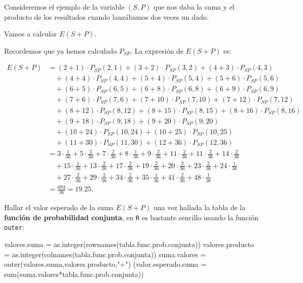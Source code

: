 \documentclass[
  letterpaper,
  DIV=11,
  numbers=noendperiod]{scrreprt}
\newenvironment{Shaded}{\begin{snugshade}}{\end{snugshade}}
\newcommand{\AttributeTok}[1]{\textcolor[rgb]{0.40,0.45,0.13}{#1}}
\newcommand{\FunctionTok}[1]{\textcolor[rgb]{0.28,0.35,0.67}{#1}}
\newcommand{\NormalTok}[1]{\textcolor[rgb]{0.00,0.23,0.31}{#1}}
\newcommand{\OtherTok}[1]{\textcolor[rgb]{0.00,0.23,0.31}{#1}}
\newcommand{\SpecialCharTok}[1]{\textcolor[rgb]{0.37,0.37,0.37}{#1}}
\newcommand{\StringTok}[1]{\textcolor[rgb]{0.13,0.47,0.30}{#1}}
\begin{document}
Consideremos el ejemplo de la variable \((S,P)\) que nos daba la suma y
el producto de los resultados cuando lanzábamos dos veces un dado.

Vamos a calcular \(E(S+P)\).

Recordemos que ya hemos calculado \(P_{SP}\). La expresión de \(E(S+P)\)
es:

\[
\begin{array}{rl}
E(S+P) & = (2+1)\cdot P_{SP}(2,1)+(3+2)\cdot P_{SP}(3,2)+(4+3)\cdot P_{SP}(4,3)  \\ &
\quad +(4+4)\cdot P_{SP}(4,4) + (5+4)\cdot P_{SP}(5,4)+(5+6)\cdot P_{SP}(5,6)\\ & 
\quad +(6+5)\cdot P_{SP}(6,5)+(6+8)\cdot P_{SP}(6,8)+ (6+9)\cdot P_{SP}(6,9) \\ &
\quad + (7+6)\cdot P_{SP}(7,6)+(7+10)\cdot P_{SP}(7,10)+(7+12)\cdot P_{SP}(7,12)\\ & 
\quad + (8+12)\cdot P_{SP}(8,12)+(8+15)\cdot P_{SP}(8,15)+(8+16)\cdot P_{SP}(8,16)\\ & 
\quad +(9+18)\cdot P_{SP}(9,18)+ (9+20)\cdot P_{SP}(9,20)\\ & 
\quad +(10+24)\cdot P_{SP}(10,24) +(10+25)\cdot P_{SP}(10,25)\\ &
\quad +(11+30)\cdot P_{SP}(11,30)  + (12+36)\cdot P_{SP}(12,36) \\ & 
=  3\cdot \frac{1}{36}+5\cdot\frac{2}{36}+7\cdot \frac{2}{36}+8\cdot \frac{1}{36}+9\cdot \frac{2}{36}+11\cdot\frac{2}{36}+11\cdot \frac{2}{36}+14\cdot\frac{2}{36}
\\ &  \quad  +15\cdot\frac{1}{36} + 13\cdot\frac{2}{36}+17\cdot\frac{2}{36}+19\cdot\frac{2}{36}+20\cdot\frac{2}{36}+23\cdot\frac{2}{36}+24\cdot\frac{1}{36}
\\ & \quad+27\cdot\frac{2}{36}+29\cdot\frac{2}{36} + 34\cdot\frac{2}{36}+35\cdot\frac{1}{36}+41\cdot\frac{2}{36}+48\cdot\frac{1}{36}\\
& =\frac{693}{36}= 19.25.
\end{array}
\]

Hallar el valor esperado de la suma \(E(S+P)\) una vez hallada la tabla
de la \textbf{función de probabilidad conjunta}, en \texttt{R} es
bastante sencillo usando la función \texttt{outer}:

\begin{Shaded}
\begin{Highlighting}[]
\NormalTok{valores.suma }\OtherTok{=} \FunctionTok{as.integer}\NormalTok{(}\FunctionTok{rownames}\NormalTok{(tabla.func.prob.conjunta))}
\NormalTok{valores.producto }\OtherTok{=} \FunctionTok{as.integer}\NormalTok{(}\FunctionTok{colnames}\NormalTok{(tabla.func.prob.conjunta))}
\NormalTok{suma.valores }\OtherTok{=} \FunctionTok{outer}\NormalTok{(valores.suma,valores.producto,}\StringTok{"+"}\NormalTok{)}
\NormalTok{(}\AttributeTok{valor.esperado.suma =} \FunctionTok{sum}\NormalTok{(suma.valores}\SpecialCharTok{*}\NormalTok{tabla.func.prob.conjunta))}
\end{Highlighting}
\end{Shaded}
\end{document}
